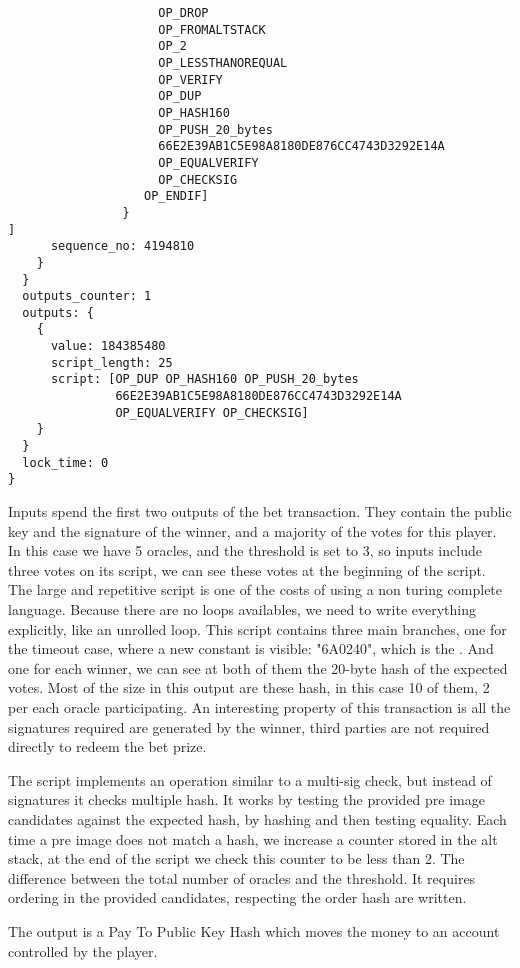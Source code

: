 \begin{lstlisting}
                     OP_DROP
                     OP_FROMALTSTACK
                     OP_2
                     OP_LESSTHANOREQUAL
                     OP_VERIFY
                     OP_DUP
                     OP_HASH160
                     OP_PUSH_20_bytes
                     66E2E39AB1C5E98A8180DE876CC4743D3292E14A
                     OP_EQUALVERIFY
                     OP_CHECKSIG
                   OP_ENDIF]
                }
]
      sequence_no: 4194810
    }
  }
  outputs_counter: 1
  outputs: {
    {
      value: 184385480
      script_length: 25
      script: [OP_DUP OP_HASH160 OP_PUSH_20_bytes
               66E2E39AB1C5E98A8180DE876CC4743D3292E14A
               OP_EQUALVERIFY OP_CHECKSIG]
    }
  }
  lock_time: 0
}
\end{lstlisting}

Inputs spend the first two outputs of the bet transaction.
They contain the public key and the signature of the winner, and a majority
  of the votes for this player.
In this case we have 5 oracles, and the threshold is set to 3, so inputs include
  three votes on its script, we can see these votes at the beginning of the
  script.
The large and repetitive script is one of the costs of using a non turing
  complete language.
Because there are no loops availables, we need to write everything explicitly,
  like an unrolled loop.
This script contains three main branches, one for the timeout case, where a new
  constant is visible: "6A0240", which is the .
And one for each winner, we can see at both of them the 20-byte hash of the
  expected votes.
Most of the size in this output are these hash, in this case 10 of them, 2 per
  each oracle participating.
An interesting property of this transaction is all the signatures required are
  generated by the winner, third parties are not required directly to redeem
  the bet prize.

The script implements an operation similar to a multi-sig check, but instead
  of signatures it checks multiple hash.
It works by testing the provided pre image candidates against the expected
  hash, by hashing and then testing equality.
Each time a pre image does not match a hash, we increase a counter stored in the
  alt stack, at the end of the script we check this counter to be less than 2.
The difference between the total number of oracles and the threshold.
It requires ordering in the provided candidates, respecting the order hash are
  written.

The output is a Pay To Public Key Hash which moves the money to an account
  controlled by the player.
